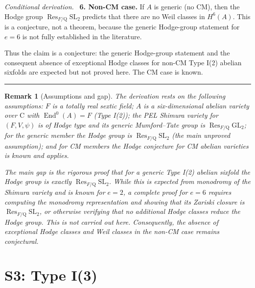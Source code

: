 \documentclass{article}
\newcommand{\mathbb}[1]{\mathrm{#1}}
\newtheorem{remark}{Remark}
\newenvironment{proof}[1][Proof]{\par\noindent\textit{#1.}\ }{\hfill\rule{1.2ex}{1.2ex}\par}
\begin{document}
\begin{proof}[Conditional derivation]
\medskip
\noindent\textbf{6. Non-CM case.}
If $A$ is generic (no CM), then the Hodge group
$\operatorname{Res}_{F/\mathbb{Q}} \mathrm{SL}_2$ predicts that there are no
Weil classes in $H^6(A)$. This is a conjecture, not a theorem, because the
generic Hodge-group statement for $e = 6$ is not fully established in the
literature.

\medskip
Thus the claim is a conjecture: the generic Hodge-group statement and the
consequent absence of exceptional Hodge classes for non-CM Type I(2) abelian
sixfolds are expected but not proved here. The CM case is known.
\end{proof}

\begin{remark}[Assumptions and gap]
The derivation rests on the following assumptions: $F$ is a totally real sextic
field; $A$ is a six-dimensional abelian variety over $\mathbb{C}$ with
$\operatorname{End}^0(A) = F$ (Type I(2)); the PEL Shimura variety for
$(F, V, \psi)$ is of Hodge type and its generic Mumford--Tate group is
$\operatorname{Res}_{F/\mathbb{Q}} \mathrm{GL}_2$; for the generic member the
Hodge group is $\operatorname{Res}_{F/\mathbb{Q}} \mathrm{SL}_2$ (the main
unproved assumption); and for CM members the Hodge conjecture for CM abelian
varieties is known and applies.

The main gap is the rigorous proof that for a generic Type I(2) abelian sixfold
the Hodge group is exactly $\operatorname{Res}_{F/\mathbb{Q}} \mathrm{SL}_2$.
While this is expected from monodromy of the Shimura variety and is known for
$e = 2$, a complete proof for $e = 6$ requires computing the monodromy
representation and showing that its Zariski closure is
$\operatorname{Res}_{F/\mathbb{Q}} \mathrm{SL}_2$, or otherwise verifying that
no additional Hodge classes reduce the Hodge group. This is not carried out
here. Consequently, the absence of exceptional Hodge classes and Weil classes in
the non-CM case remains conjectural.
\end{remark}

\section{S3: Type I(3)}
\end{document}
